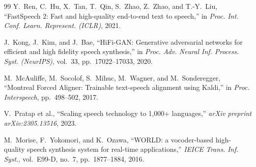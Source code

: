 \documentclass[11pt,a4paper]{report}
\begin{document}
\FloatBarrier
\vspace{1.5em}

\begin{thebibliography}{99}
Y.~Ren, C.~Hu, X.~Tan, T.~Qin, S.~Zhao, Z.~Zhao, and T.-Y.~Liu, ``FastSpeech 2: Fast and high-quality end-to-end text to speech,'' in \textit{Proc. Int. Conf. Learn. Represent. (ICLR)}, 2021.

J.~Kong, J.~Kim, and J.~Bae, ``HiFi-GAN: Generative adversarial networks for efficient and high fidelity speech synthesis,'' in \textit{Proc. Adv. Neural Inf. Process. Syst. (NeurIPS)}, vol.~33, pp.~17022--17033, 2020.

M.~McAuliffe, M.~Socolof, S.~Mihuc, M.~Wagner, and M.~Sonderegger, ``Montreal Forced Aligner: Trainable text-speech alignment using Kaldi,'' in \textit{Proc. Interspeech}, pp.~498--502, 2017.

V.~Pratap et al., ``Scaling speech technology to 1,000+ languages,'' \textit{arXiv preprint arXiv:2305.13516}, 2023.

M.~Morise, F.~Yokomori, and K.~Ozawa, ``WORLD: a vocoder-based high-quality speech synthesis system for real-time applications,'' \textit{IEICE Trans. Inf. Syst.}, vol.~E99-D, no.~7, pp.~1877--1884, 2016.
\end{thebibliography}
\end{document}
